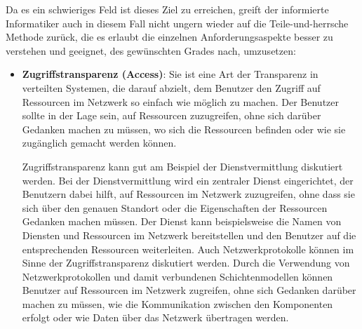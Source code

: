 \documentclass[../vs-script-first-v01.tex]{subfiles}
\begin{document}
Da es ein schwieriges Feld ist dieses Ziel zu erreichen, greift der informierte Informatiker auch in diesem Fall nicht ungern wieder auf die Teile-und-herrsche Methode zurück, die es erlaubt die einzelnen Anforderungsaspekte besser zu verstehen und geeignet, des gewünschten Grades nach, umzusetzen:
\begin{itemize}
  \item  \textbf{Zugriffstransparenz (Access)}: Sie ist eine Art der Transparenz in verteilten Systemen, die darauf abzielt, dem Benutzer den Zugriff auf Ressourcen im Netzwerk so einfach wie möglich zu machen. Der Benutzer sollte in der Lage sein, auf Ressourcen zuzugreifen, ohne sich darüber Gedanken machen zu müssen, wo sich die Ressourcen befinden oder wie sie zugänglich gemacht werden können.

        Zugriffstransparenz kann gut am Beispiel der Dienstvermittlung diskutiert werden. Bei der Dienstvermittlung wird ein zentraler Dienst eingerichtet, der Benutzern dabei hilft, auf Ressourcen im Netzwerk zuzugreifen, ohne dass sie sich über den genauen Standort oder die Eigenschaften der Ressourcen Gedanken machen müssen. Der Dienst kann beispielsweise die Namen von Diensten und Ressourcen im Netzwerk bereitstellen und den Benutzer auf die entsprechenden Ressourcen weiterleiten.
        Auch Netzwerkprotokolle können im Sinne der Zugriffstransparenz diskutiert werden. Durch die Verwendung von Netzwerkprotokollen und damit verbundenen Schichtenmodellen können Benutzer auf Ressourcen im Netzwerk zugreifen, ohne sich Gedanken darüber machen zu müssen, wie die Kommunikation zwischen den Komponenten erfolgt oder wie Daten über das Netzwerk übertragen werden.


\end{itemize}
\end{document}

